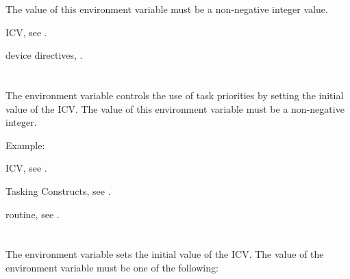 The value of this environment variable must be a non-negative integer value.

\begin{crossrefs}
\item {} ICV, see .

\item device directives, .
\end{crossrefs}



\section{}
\label{sec:OMP_MAX_TASK_PRIORITY}

The  environment variable controls the use of task
priorities by setting the initial value of the  ICV. The
value of this environment variable must be a non-negative integer.

Example:
\begin{ompEnv}
\end{ompEnv}

\begin{crossrefs}
\item {} ICV, see .

\item Tasking Constructs, see .

\item {} routine,
see .
\end{crossrefs}



\section{}
\label{sec:OMP_TARGET_OFFLOAD}
The  environment variable sets the initial value of
the  ICV. The value of the 
environment variable must be one of the following:

